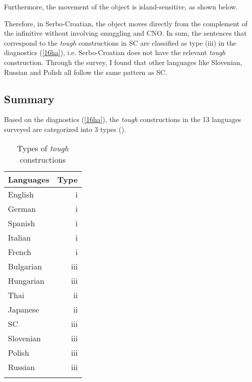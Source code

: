 \documentclass[output=paper]{langscibook}
\begin{document}
Furthermore, the movement of the object is island-sensitive, as shown below. 

\begin{exe}
\ex \label{35ha}
\begin{xlist}

\end{xlist}
\end{exe}

Therefore, in Serbo-Croatian, the object moves directly from the complement of the infinitive without involving smuggling and CNO. In sum, the sentences that correspond to the \textit{tough} constructions in SC are classified as type (iii) in the diagnostics (\ref{16ha}), i.e. Serbo-Croatian does not have the relevant \textit{tough} construction. Through the survey, I found that other languages like Slovenian, Russian and Polish all follow the same pattern as SC. 

\subsection{Summary} \label{s3.5ha}
Based on the diagnostics (\ref{16ha}), the \textit{tough} constructions in the 13 languages surveyed are categorized into 3 types ().

\begin{table}
\caption{Types of \textit{tough} constructions}
\label{tab:1:types}
 \begin{tabular}{l r}
  \lsptoprule
  Languages  & Type\\
  \midrule
  English  &   i  \\
  German  &   i\\
  Spanish & i\\
  Italian & i\\
  French & i\\
  Bulgarian & iii\\
  Hungarian & iii\\
  Thai & ii\\
  Japanese & ii\\
  SC & iii\\
  Slovenian & iii\\
  Polish & iii\\
  Russian & iii\\
  \lspbottomrule
 \end{tabular}
\end{table}
\end{document}
